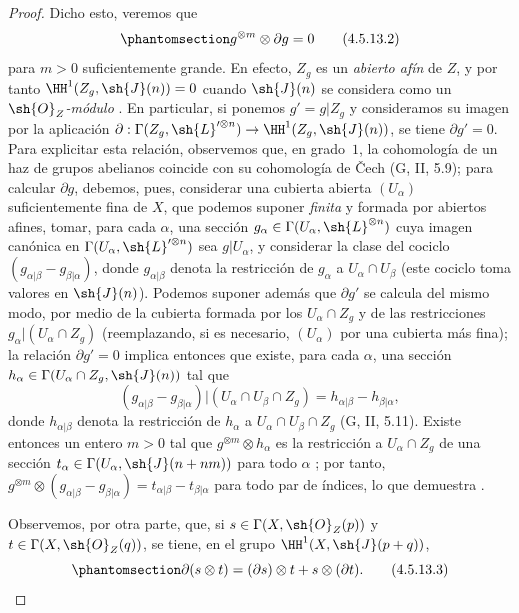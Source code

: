 \documentclass[oneside,10pt]{amsart}
\makeatletter
\newcommand{\ega@arrow}[2]{\mathchoice{#1}{#2}{#2}{#2}}
\renewcommand{\to}{\ega@arrow{\longrightarrow}{\rightarrow}}
\let\EGAOriginalLabel\label
\renewcommand{\label}[1]{\phantomsection\EGAOriginalLabel{#1}}
\makeatother
\begin{document}
\begin{proof}
  Dicho esto, veremos que
  \[
  \label{II.4.5.13.2}
    g^{\otimes m}\otimes\partial g=0
  \tag{4.5.13.2}
  \]
  para $m>0$ suficientemente grande.
  En efecto, $Z_g$ es un \emph{abierto afín} de $Z$, y por tanto $\HH^1(Z_g,\sh{J}(n))=0$ cuando $\sh{J}(n)$ se considera como un \emph{$\sh{O}_Z$-módulo} .
  En particular, si ponemos $g'=g|Z_g$ y consideramos su imagen por la aplicación $\partial:\Gamma(Z_g,\sh{L}'^{\otimes n})\to\HH^1(Z_g,\sh{J}(n))$, se tiene $\partial g'=0$.
  Para explicitar esta relación, observemos que, en grado~$1$, la cohomología de un haz de grupos abelianos coincide con su cohomología de \v{C}ech (G, II, 5.9);
  para calcular $\partial g$, debemos, pues, considerar una cubierta abierta $(U_\alpha)$ suficientemente fina de $X$, que podemos suponer \emph{finita} y formada por abiertos afines, tomar, para cada $\alpha$, una sección $g_\alpha\in\Gamma(U_\alpha,\sh{L}^{\otimes n})$ cuya imagen canónica en $\Gamma(U_\alpha,\sh{L}'^{\otimes n})$ sea $g|U_\alpha$, y considerar la clase del cociclo $(g_{\alpha|\beta}-g_{\beta|\alpha})$, donde $g_{\alpha|\beta}$ denota la restricción de $g_\alpha$ a $U_\alpha\cap U_\beta$ (este cociclo toma valores en $\sh{J}(n)$).
  Podemos suponer además que $\partial g'$ se calcula del mismo modo, por medio de la cubierta formada por los $U_\alpha\cap Z_g$ y de las restricciones $g_\alpha|(U_\alpha\cap Z_g)$ (reemplazando, si es necesario, $(U_\alpha)$ por una cubierta más fina);
  la relación $\partial g'=0$ implica entonces que existe, para cada $\alpha$, una sección $h_\alpha\in\Gamma(U_\alpha\cap Z_g,\sh{J}(n))$ tal que
  \[
    (g_{\alpha|\beta}-g_{\beta|\alpha})|(U_\alpha\cap U_\beta\cap Z_g)=h_{\alpha|\beta}-h_{\beta|\alpha},
  \]
  donde $h_{\alpha|\beta}$ denota la restricción de $h_\alpha$ a $U_\alpha\cap U_\beta\cap Z_g$ (G, II, 5.11).
  Existe entonces un entero $m>0$ tal que $g^{\otimes m}\otimes h_\alpha$ es la restricción a $U_\alpha\cap Z_g$ de una sección $t_\alpha\in\Gamma(U_\alpha,\sh{J}(n+nm))$ para todo $\alpha$ ;
  por tanto, $g^{\otimes m}\otimes(g_{\alpha|\beta}-g_{\beta|\alpha})=t_{\alpha|\beta}-t_{\beta|\alpha}$ para todo par de índices, lo que demuestra .

  Observemos, por otra parte, que, si $s\in\Gamma(X,\sh{O}_Z(p))$ y $t\in\Gamma(X,\sh{O}_Z(q))$, se tiene, en el grupo $\HH^1(X,\sh{J}(p+q))$,
  \[
  \label{II.4.5.13.3}
    \partial(s\otimes t)=(\partial s)\otimes t+s\otimes(\partial t).
  \tag{4.5.13.3}
  \]


\end{proof}
\end{document}

